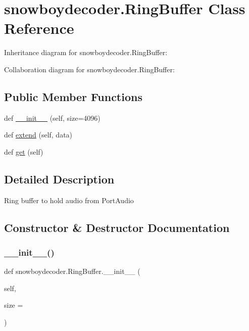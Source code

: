 \hypertarget{classsnowboydecoder_1_1RingBuffer}{}\section{snowboydecoder.\+Ring\+Buffer Class Reference}
\label{classsnowboydecoder_1_1RingBuffer}


Inheritance diagram for snowboydecoder.\+Ring\+Buffer\+:


Collaboration diagram for snowboydecoder.\+Ring\+Buffer\+:
\subsection*{Public Member Functions}
\begin{DoxyCompactItemize}
\item 
def \hyperlink{classsnowboydecoder_1_1RingBuffer_a0e81257f8756886d0fbfb195ccd5b681}{\+\_\+\+\_\+init\+\_\+\+\_\+} (self, size=4096)
\item 
def \hyperlink{classsnowboydecoder_1_1RingBuffer_a8abd8bc5da6f36309861332258669790}{extend} (self, data)
\item 
def \hyperlink{classsnowboydecoder_1_1RingBuffer_ad083eb25f13fa3d7947caf62ca0d7353}{get} (self)
\end{DoxyCompactItemize}


\subsection{Detailed Description}
\begin{DoxyVerb}Ring buffer to hold audio from PortAudio\end{DoxyVerb}
 

\subsection{Constructor \& Destructor Documentation}
\mbox{\label{classsnowboydecoder_1_1RingBuffer_a0e81257f8756886d0fbfb195ccd5b681}} 
\subsubsection{\texorpdfstring{\+\_\+\+\_\+init\+\_\+\+\_\+()}{\_\_init\_\_()}}
{\footnotesize\ttfamily def snowboydecoder.\+Ring\+Buffer.\+\_\+\+\_\+init\+\_\+\+\_\+ (\begin{DoxyParamCaption}\item[{}]{self,  }\item[{}]{size = {} }\end{DoxyParamCaption})}




